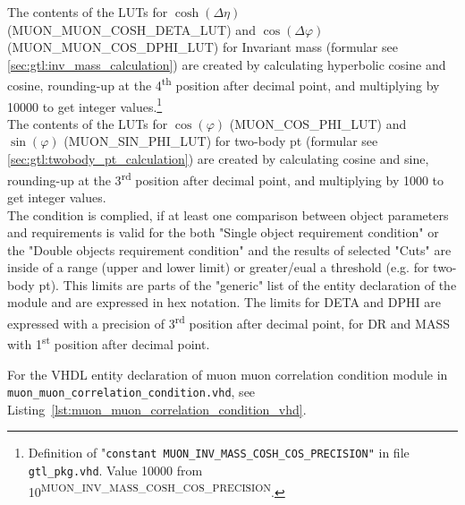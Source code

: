 The contents of the LUTs for $\cosh(\Delta\eta)$ (\small{MUON\_MUON\_COSH\_DETA\_LUT}\normalsize) and $\cos(\Delta\varphi)$ (\small{MUON\_MUON\_COS\_DPHI\_LUT}\normalsize) for Invariant mass (formular see \ref{sec:gtl:inv_mass_calculation}) are created by calculating hyperbolic cosine and cosine, rounding-up at the 4\textsuperscript{th} position after decimal point, and multiplying by 10000 to get integer values.\footnote{Definition of "\texttt{constant \small{MUON\_INV\_MASS\_COSH\_COS\_PRECISION}\normalsize"} in file \texttt{gtl\_pkg.vhd}. Value 10000 from 10\textsuperscript{\tiny{MUON\_INV\_MASS\_COSH\_COS\_PRECISION}}\normalsize.}\\
The contents of the LUTs for $\cos(\varphi)$ (\small{MUON\_COS\_PHI\_LUT}\normalsize) and $\sin(\varphi)$ (\small{MUON\_SIN\_PHI\_LUT}\normalsize) for two-body pt 
(formular see \ref{sec:gtl:twobody_pt_calculation}) are created by calculating cosine and sine, rounding-up at the 3\textsuperscript{rd} position after decimal point,
and multiplying by 1000 to get integer values.\\
The condition is complied, if at least one comparison between object parameters and requirements is valid for the both "Single object requirement condition" or the "Double objects requirement condition" and the results of selected "Cuts" are inside of a range (upper and lower limit) or greater/eual a threshold (e.g. for two-body pt).
This limits are parts of the "generic" list of the entity declaration of the module and are expressed in hex notation. The limits for DETA and DPHI
are expressed with a precision of 3\textsuperscript{rd} position after decimal point, for DR and MASS with 1\textsuperscript{st} position after decimal point.

For the VHDL entity declaration of muon muon correlation condition module in \texttt{muon\_muon\_correlation\_condition.vhd}, see Listing~\ref{lst:muon_muon_correlation_condition_vhd}.\\
\clearpage


